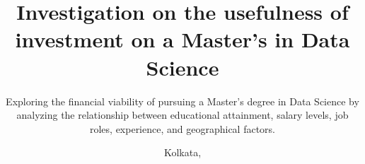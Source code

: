 





\title{Investigation on the usefulness of investment on a Master's in Data Science}

\subtitle{Exploring the financial viability of pursuing a Master's degree in Data Science by analyzing the relationship between educational attainment, salary levels, job roles, experience, and geographical factors.}


\school{}

\department{}




\date{Kolkata, \DTMmonthname{\month} \number\year}